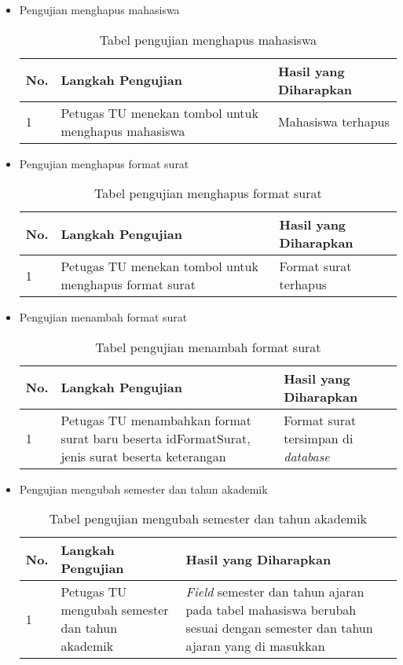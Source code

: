 \begin{itemize}
	\item Pengujian menghapus mahasiswa
	\begin{table}[H]
	\centering
	\caption{Tabel pengujian menghapus mahasiswa}
	\label{pengujian_menghapus_mahasiswa}
	\begin{tabular}{|l|p{6cm}|p{6cm}|}
	\hline
	\textbf{No.}&\textbf{Langkah Pengujian}&\textbf{Hasil yang Diharapkan}\\ \hline
	1&Petugas TU menekan tombol untuk menghapus mahasiswa&Mahasiswa terhapus \\ \hline
	\end{tabular}
	\end{table}
	
	\item Pengujian menghapus format surat
	\begin{table}[H]
	\centering
	\caption{Tabel pengujian menghapus format surat}
	\label{pengujian_menghapus_format_surat}
	\begin{tabular}{|l|p{6cm}|p{6cm}|}
	\hline
	\textbf{No.}&\textbf{Langkah Pengujian}&\textbf{Hasil yang Diharapkan}\\ \hline
	1&Petugas TU menekan tombol untuk menghapus format surat&Format surat terhapus\\ \hline
	\end{tabular}
	\end{table}
	
	\item Pengujian menambah format surat
	\begin{table}[H]
	\centering
	\caption{Tabel pengujian menambah format surat}
	\label{pengujian_menghapus_format_surat}
	\begin{tabular}{|l|p{6cm}|p{6cm}|}
	\hline
	\textbf{No.}&\textbf{Langkah Pengujian}&\textbf{Hasil yang Diharapkan}\\ \hline
	1&Petugas TU menambahkan format surat baru beserta idFormatSurat, jenis surat beserta keterangan&Format surat tersimpan di \textit{database}\\ \hline
	\end{tabular}
	\end{table}
	
	\item Pengujian mengubah semester dan tahun akademik
	\begin{table}[H]
	\centering
	\caption{Tabel pengujian mengubah semester dan tahun akademik}
	\label{pengujian_mengubah_semester_dan_tahun_akademik}
	\begin{tabular}{|l|p{6cm}|p{6cm}|}
	\hline
	\textbf{No.}&\textbf{Langkah Pengujian}&\textbf{Hasil yang Diharapkan}\\ \hline
	1&Petugas TU mengubah semester dan tahun akademik&\textit{Field} semester dan tahun ajaran pada tabel mahasiswa berubah sesuai dengan semester dan tahun ajaran yang di	masukkan\\ \hline
	\end{tabular}
	\end{table}
	
\end{itemize}
